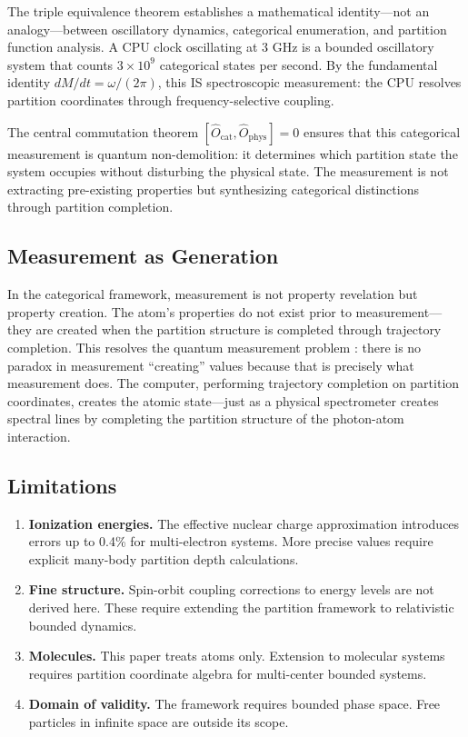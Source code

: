 \documentclass[11pt,twocolumn,a4paper]{article}
\theoremstyle{definition}
\theoremstyle{remark}
\begin{document}
The triple equivalence theorem establishes a mathematical identity---not an analogy---between oscillatory dynamics, categorical enumeration, and partition function analysis. A CPU clock oscillating at 3 GHz is a bounded oscillatory system that counts $3 \times 10^9$ categorical states per second. By the fundamental identity $dM/dt = \omega/(2\pi)$, this IS spectroscopic measurement: the CPU resolves partition coordinates through frequency-selective coupling.

The central commutation theorem $[\hat{O}_{\mathrm{cat}}, \hat{O}_{\mathrm{phys}}] = 0$ ensures that this categorical measurement is quantum non-demolition: it determines which partition state the system occupies without disturbing the physical state. The measurement is not extracting pre-existing properties but synthesizing categorical distinctions through partition completion.

\subsection{Measurement as Generation}

In the categorical framework, measurement is not property revelation but property creation. The atom's properties do not exist prior to measurement---they are created when the partition structure is completed through trajectory completion. This resolves the quantum measurement problem \citep{caves1980}: there is no paradox in measurement ``creating'' values because that is precisely what measurement does. The computer, performing trajectory completion on partition coordinates, creates the atomic state---just as a physical spectrometer creates spectral lines by completing the partition structure of the photon-atom interaction.

\subsection{Limitations}

\begin{enumerate}
\item \textbf{Ionization energies.} The effective nuclear charge approximation introduces errors up to 0.4\% for multi-electron systems. More precise values require explicit many-body partition depth calculations.
\item \textbf{Fine structure.} Spin-orbit coupling corrections to energy levels are not derived here. These require extending the partition framework to relativistic bounded dynamics.
\item \textbf{Molecules.} This paper treats atoms only. Extension to molecular systems requires partition coordinate algebra for multi-center bounded systems.
\item \textbf{Domain of validity.} The framework requires bounded phase space. Free particles in infinite space are outside its scope.
\end{enumerate}
\end{document}

